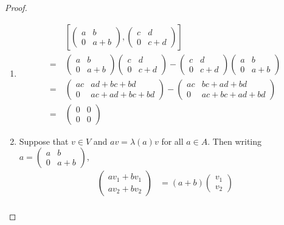 \documentclass[12pt]{article}
\theoremstyle{definition}
\begin{document}
\begin{proof}\
	\begin{enumerate}[label=(\alph*)]
		\item \begin{align*}
			          & \left[\begin{pmatrix}a & b \\ 0 & a+b\end{pmatrix}, \begin{pmatrix}c & d \\ 0 & c+d\end{pmatrix}\right]                                                                             \\
			      =\  & \begin{pmatrix}a & b \\ 0 & a+b\end{pmatrix}\begin{pmatrix}c & d \\ 0 & c+d\end{pmatrix} - \begin{pmatrix}c & d \\ 0 & c+d\end{pmatrix}\begin{pmatrix}a & b \\ 0 & a+b\end{pmatrix} \\
			      =\  & \begin{pmatrix}ac & ad + bc + bd \\ 0 & ac + ad + bc + bd\end{pmatrix} - \begin{pmatrix}ac & bc + ad + bd \\ 0 & ac + bc + ad + bd\end{pmatrix}                                     \\
			      =\  & \begin{pmatrix}0 & 0 \\ 0 & 0\end{pmatrix}
		      \end{align*}
		\item Suppose that $v \in V$ and $av = \lambda(a)v$ for all $a \in A$.
		      Then writing $a = \begin{pmatrix}a & b \\ 0 & a + b\end{pmatrix}$, \begin{align*}
			      \begin{pmatrix}av_1 + bv_1 \\ av_2 + bv_2\end{pmatrix} & = (a + b)\begin{pmatrix}v_1\\v_2\end{pmatrix}                                        \\

\end{align*}
\end{enumerate}
\end{proof}
\end{document}
